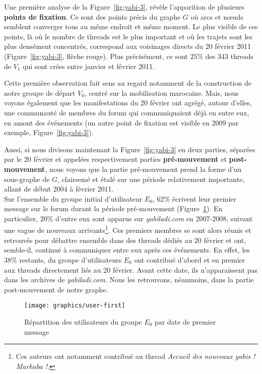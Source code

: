 \documentclass[symmetric,justified,marginals=raggedouter]{tufte-book}
\begin{document}
\noindent Une première analyse de la Figure~\ref{fig:yabi-3}, révèle l'apparition de plusieurs \textbf{points de fixation}. Ce sont des points précis du graphe $G$ où arcs et nœuds semblent converger tous au même endroit et même moment. Le plus visible de ces points, là où le nombre de threads est le plus important et où les trajets sont les plus densément  concentrés, correspond aux voisinages directs du 20 février 2011 (Figure~\ref{fig:yabi-3}, flèche rouge). Plus précisément,  ce sont $25\%$ des 343 threads de $V_1$ qui sont crées entre janvier et février 2011.

Cette première observation fait sens au regard notamment de la construction de notre groupe de départ $V_0$, centré sur la mobilisation marocaine. Mais, nous voyons également que les manifestations du 20 février ont agrégé, autour d'elles, une communauté de membres du forum qui communiquaient déjà en entre eux, en amont des événements (un autre point de fixation est visible en 2009 par exemple, Figure~\ref{fig:yabi-3}).

Aussi, si nous divisons maintenant la Figure~\ref{fig:yabi-3} en deux parties, séparées par le 20 février et appelées respectivement parties \textbf{pré-mouvement} et \textbf{post-mouvement}, nous voyons que la partie pré-mouvement prend la forme d'un sous-graphe de $G$, clairsemé et étalé sur une période relativement importante, allant de début 2004 à février 2011.\\

\noindent Sur l'ensemble du groupe initial d'utilisateur $E_0$, $62\%$ écrivent leur premier message sur le forum durant la période pré-mouvement (Figure~\ref{fig:user-first}). En particulier, $20\%$ d'entre eux sont apparus sur \textit{yabiladi.com} en 2007-2008, suivant une vague de nouveaux arrivants\footnote{\RaggedOuter Ces auteurs ont notamment contribué au thread \og\textit{Accueil des nouveaux yabis ! Marhaba !}\fg{}.}. Ces premiers membres se sont alors réunis et retrouvés pour débattre ensemble dans des threads dédiés au 20 février et ont, semble-il, continué à communiquer entre eux après ces événements. En effet, les $38\%$ restants, du groupe d'utilisateurs $E_0$ ont contribué d'abord et en premier aux threads directement liés au 20 février. Avant cette date, ils n'apparaissent pas dans les archives de \textit{yabiladi.com}. Nous les retrouvons, néanmoins, dans la partie post-mouvement de notre graphe. \\

\newpage

\begin{figure}
  \texttt{[image: graphics/user-first]}
  \caption{Répartition des utilisateurs du groupe $E_0$ par date de premier message}
  \label{fig:user-first}
\end{figure}  
\end{document}
